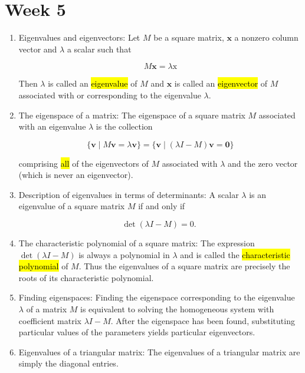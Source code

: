 \documentclass{article}
\begin{document}
\section{Week 5}
\begin{enumerate}
    \item Eigenvalues and eigenvectors: Let $M$ be a square matrix, $\mathbf{x}$ a nonzero column vector and $\lambda$ a scalar such that

    $$
    M \mathbf{x}=\lambda \mathrm{x}
    $$

    Then $\lambda$ is called an \hl{eigenvalue} of $M$ and $\mathbf{x}$ is called an \hl{eigenvector} of $M$ associated with or corresponding to the eigenvalue $\lambda$.

    \item The eigenspace of a matrix: The eigenspace of a square matrix $M$ associated with an eigenvalue $\lambda$ is the collection

    $$
    \{\mathbf{v} \mid M \mathbf{v}=\lambda \mathbf{v}\}=\{\mathbf{v} \mid(\lambda I-M) \mathbf{v}=\mathbf{0}\}
    $$

    comprising \hl{all} of the eigenvectors of $M$ associated with $\lambda$ and the zero vector (which is never an eigenvector).

    \item Description of eigenvalues in terms of determinants: A scalar $\lambda$ is an eigenvalue of a square matrix $M$ if and only if

    $$
    \operatorname{det}(\lambda I-M)=0 \text {. }
    $$

    \item The characteristic polynomial of a square matrix: The expression $\operatorname{det}(\lambda I-M)$ is always a polynomial in $\lambda$ and is called the \hl{characteristic polynomial} of $M$. Thus the eigenvalues of a square matrix are precisely the roots of its characteristic polynomial.

    \item Finding eigenspaces: Finding the eigenspace corresponding to the eigenvalue $\lambda$ of a matrix $M$ is equivalent to solving the homogeneous system with coefficient matrix $\lambda I-M$. After the eigenspace has been found, substituting particular values of the parameters yields particular eigenvectors.

    \item Eigenvalues of a triangular matrix: The eigenvalues of a triangular matrix are simply the diagonal entries.


\end{enumerate}
\end{document}
